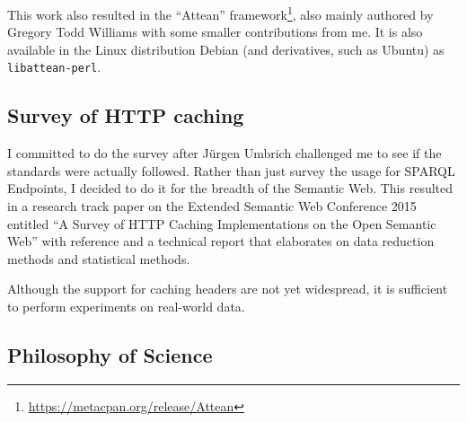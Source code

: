 This work also resulted in the ``Attean''
framework\footnote{\url{https://metacpan.org/release/Attean}}, also
mainly authored by Gregory Todd Williams with some smaller
contributions from me. It is also available in the Linux distribution
Debian (and derivatives, such as Ubuntu) as \texttt{libattean-perl}.

\subsection{Survey of HTTP caching}\label{sec:consanity}

I committed to do the survey after Jürgen Umbrich challenged me to see
if the standards were actually followed. Rather than just survey the
usage for SPARQL Endpoints, I decided to do it for the breadth of the
Semantic Web. This resulted in a research track paper on the Extended
Semantic Web Conference 2015 entitled ``A Survey of HTTP Caching
Implementations on the Open Semantic Web'' with reference
\cite{kjernsmo_survey_2015} and a technical report
\cite{kjernsmo_add_survey_2015} that elaborates on data reduction
methods and statistical methods.

Although the support for caching headers are not yet widespread, it is
sufficient to perform experiments on real-world data.

\subsection{Philosophy of Science}\label{sec:conphil}
